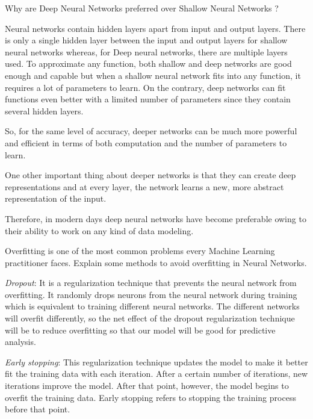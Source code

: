 \documentclass[12pt,a4paper]{exam}
\begin{document}
\question
Why are Deep Neural Networks preferred over Shallow Neural Networks ?
\fillwithlines{3cm}
\begin{solution}
Neural networks contain hidden layers apart from input and output layers. There is only a single hidden layer between the input and output layers for shallow neural networks whereas, for Deep neural networks, there are multiple layers used.
To approximate any function, both shallow and deep networks are good enough and capable but when a shallow neural network fits into any function, it requires a lot of parameters to learn. On the contrary, deep networks can fit functions even better with a limited number of parameters since they contain several hidden layers.

So, for the same level of accuracy, deeper networks can be much more powerful and efficient in terms of both computation and the number of parameters to learn.

One other important thing about deeper networks is that they can create deep representations and at every layer, the network learns a new, more abstract representation of the input.

Therefore, in modern days deep neural networks have become preferable owing to their ability to work on any kind of data modeling.
\end{solution}

\question
Overfitting is one of the most common problems every Machine Learning practitioner faces. Explain some methods to avoid overfitting in Neural Networks.
\fillwithlines{3cm}
\begin{solution}
\emph{Dropout}: It is a regularization technique that prevents the neural network from overfitting. It randomly drops neurons from the neural network during training which is equivalent to training different neural networks. The different networks will overfit differently, so the net effect of the dropout regularization technique will be to reduce overfitting so that our model will be good for predictive analysis.

\emph{Early stopping}: This regularization technique updates the model to make it better fit the training data with each iteration. After a certain number of iterations, new iterations improve the model. After that point, however, the model begins to overfit the training data. Early stopping refers to stopping the training process before that point.
\end{solution}
\end{document}
